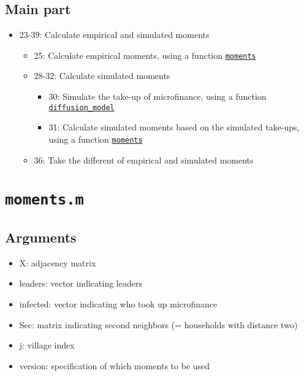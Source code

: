 \documentclass[10pt,letterpaper]{article}
\begin{document}
\subsection*{Main part}
\begin{itemize}
  \item 23-39: Calculate empirical and simulated moments
    \begin{itemize}
      \item 25: Calculate empirical moments, using a function \hyperref[moments]{\texttt{moments}}
      \item 28-32: Calculate simulated moments
        \begin{itemize}
          \item 30: Simulate the take-up of microfinance, using a function \hyperref[diffusion_model]{\texttt{diffusion\_model}}
          \item 31: Calculate simulated moments based on the simulated take-ups, using a function \hyperref[moments]{\texttt{moments}}
        \end{itemize}
      \item 36: Take the different of empirical and simulated moments
    \end{itemize}
\end{itemize}

\section{\texttt{moments.m}}\label{moments}

\subsection*{Arguments}
\begin{itemize}
  \item X: adjacency matrix
  \item leaders: vector indicating leaders
  \item infected: vector indicating who took up microfinance
  \item Sec: matrix indicating second neighbors (= households with distance two)
  \item j: village index
  \item version: specification of which moments to be used
\end{itemize}
\end{document}
